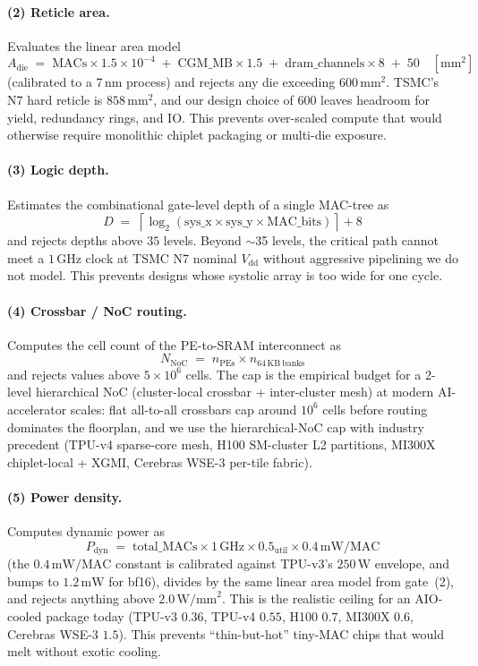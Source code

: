 \paragraph{(2) Reticle area.}
Evaluates the linear area model
\[
A_{\mathrm{die}} \;=\; \mathrm{MACs} \times 1.5 \times 10^{-4} \;+\; \mathrm{CGM\_MB} \times 1.5 \;+\; \mathrm{dram\_channels} \times 8 \;+\; 50 \quad [\mathrm{mm}^2]
\]
(calibrated to a 7\,nm process) and rejects any die exceeding $600\,\mathrm{mm}^2$. TSMC's N7 hard reticle is $858\,\mathrm{mm}^2$, and our design choice of 600 leaves headroom for yield, redundancy rings, and IO. This prevents over-scaled compute that would otherwise require monolithic chiplet packaging or multi-die exposure.

\paragraph{(3) Logic depth.}
Estimates the combinational gate-level depth of a single MAC-tree as
\[
D \;=\; \left\lceil \log_2(\mathrm{sys\_x} \times \mathrm{sys\_y} \times \mathrm{MAC\_bits}) \right\rceil + 8
\]
and rejects depths above $35$ levels. Beyond $\sim$35 levels, the critical path cannot meet a $1\,\mathrm{GHz}$ clock at TSMC N7 nominal $V_{\mathrm{dd}}$ without aggressive pipelining we do not model. This prevents designs whose systolic array is too wide for one cycle.

\paragraph{(4) Crossbar / NoC routing.}
Computes the cell count of the PE-to-SRAM interconnect as
\[
N_{\mathrm{NoC}} \;=\; n_{\mathrm{PEs}} \times n_{64\,\mathrm{KB\ banks}}
\]
and rejects values above $5 \times 10^6$ cells. The cap is the empirical budget for a 2-level hierarchical NoC (cluster-local crossbar + inter-cluster mesh) at modern AI-accelerator scales: flat all-to-all crossbars cap around $10^6$ cells before routing dominates the floorplan, and we use the hierarchical-NoC cap with industry precedent (TPU-v4 sparse-core mesh, H100 SM-cluster L2 partitions, MI300X chiplet-local + XGMI, Cerebras WSE-3 per-tile fabric).

\paragraph{(5) Power density.}
Computes dynamic power as
\[
P_{\mathrm{dyn}} \;=\; \mathrm{total\_MACs} \times 1\,\mathrm{GHz} \times 0.5_{\mathrm{util}} \times 0.4\,\mathrm{mW/MAC}
\]
(the $0.4\,\mathrm{mW/MAC}$ constant is calibrated against TPU-v3's $250\,\mathrm{W}$ envelope, and bumps to $1.2\,\mathrm{mW}$ for bf16), divides by the same linear area model from gate~(2), and rejects anything above $2.0\,\mathrm{W/mm}^2$. This is the realistic ceiling for an AIO-cooled package today (TPU-v3 $0.36$, TPU-v4 $0.55$, H100 $0.7$, MI300X $0.6$, Cerebras WSE-3 $1.5$). This prevents ``thin-but-hot'' tiny-MAC chips that would melt without exotic cooling.

